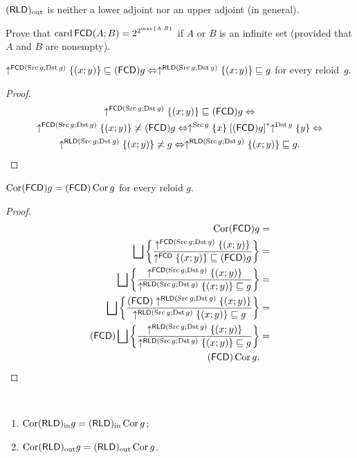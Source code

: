 \begin{conjecture}
$(\mathsf{RLD})_{\mathrm{out}}$ is neither a lower adjoint nor an upper adjoint (in general).\end{conjecture}
\begin{xca}
Prove that $\operatorname{card}\mathsf{FCD}(A;B)=2^{2^{\max\{A,B\}}}$ if $A$ or
$B$ is an infinite set (provided that $A$ and $B$ are nonempty).\end{xca}
\begin{lem}
$\uparrow^{\mathsf{FCD}(\operatorname{Src} g;\operatorname{Dst} g)}\{(x;y)\}\sqsubseteq(\mathsf{FCD}) g\Leftrightarrow\uparrow^{\mathsf{RLD}(\operatorname{Src} g;\operatorname{Dst} g)}\{(x;y)\}\sqsubseteq g$
for every reloid~$g$.\end{lem}
\begin{proof}
~
\begin{multline*}
\uparrow^{\mathsf{FCD}(\operatorname{Src} g;\operatorname{Dst} g)}\{(x;y)\}\sqsubseteq(\mathsf{FCD}) g\Leftrightarrow\\
\uparrow^{\mathsf{FCD}(\operatorname{Src} g;\operatorname{Dst} g)}\{(x;y)\}\not\asymp(\mathsf{FCD}) g\Leftrightarrow\uparrow^{\operatorname{Src} g}\{x\}\mathrel{\left[(\mathsf{FCD}) g\right]^{\ast}}\uparrow^{\operatorname{Dst} g}\{y\}\Leftrightarrow\\
\uparrow^{\mathsf{RLD}(\operatorname{Src} g;\operatorname{Dst} g)}\{(x;y)\}\not\asymp g\Leftrightarrow\uparrow^{\mathsf{RLD}(\operatorname{Src} g;\operatorname{Dst} g)}\{(x;y)\}\sqsubseteq g.
\end{multline*}
\end{proof}
\begin{thm}
$\operatorname{Cor}(\mathsf{FCD}) g=(\mathsf{FCD})\operatorname{Cor} g$ for every reloid $g$.\end{thm}
\begin{proof}
~
\begin{align*}
\operatorname{Cor}(\mathsf{FCD}) g & =\\
\bigsqcup\left\{ \frac{\uparrow^{\mathsf{FCD}(\operatorname{Src} g;\operatorname{Dst} g)}\{(x;y)\}}{\uparrow^{\mathsf{FCD}}\{(x;y)\}\sqsubseteq(\mathsf{FCD}) g}\right\} & =\\
\bigsqcup\left\{ \frac{\uparrow^{\mathsf{FCD}(\operatorname{Src} g;\operatorname{Dst} g)}\{(x;y)\}}{\uparrow^{\mathsf{RLD}(\operatorname{Src} g;\operatorname{Dst} g)}\{(x;y)\}\sqsubseteq g}\right\} & =\\
\bigsqcup\left\{ \frac{(\mathsf{FCD})\uparrow^{\mathsf{RLD}(\operatorname{Src} g;\operatorname{Dst} g)}\{(x;y)\}}{\uparrow^{\mathsf{RLD}(\operatorname{Src} g;\operatorname{Dst} g)}\{(x;y)\}\sqsubseteq g}\right\} & =\\
(\mathsf{FCD})\bigsqcup\left\{ \frac{\uparrow^{\mathsf{RLD}(\operatorname{Src} g;\operatorname{Dst} g)}\{(x;y)\}}{\uparrow^{\mathsf{RLD}(\operatorname{Src} g;\operatorname{Dst} g)}\{(x;y)\}\sqsubseteq g}\right\} & =\\
(\mathsf{FCD})\operatorname{Cor} g.
\end{align*}
\end{proof}
\begin{conjecture}
~
\begin{enumerate}
\item $\operatorname{Cor}(\mathsf{RLD})_{\mathrm{in}} g=(\mathsf{RLD})_{\mathrm{in}}\operatorname{Cor} g$;
\item $\operatorname{Cor}(\mathsf{RLD})_{\mathrm{out}} g=(\mathsf{RLD})_{\mathrm{out}}\operatorname{Cor} g$.
\end{enumerate}
\end{conjecture}

